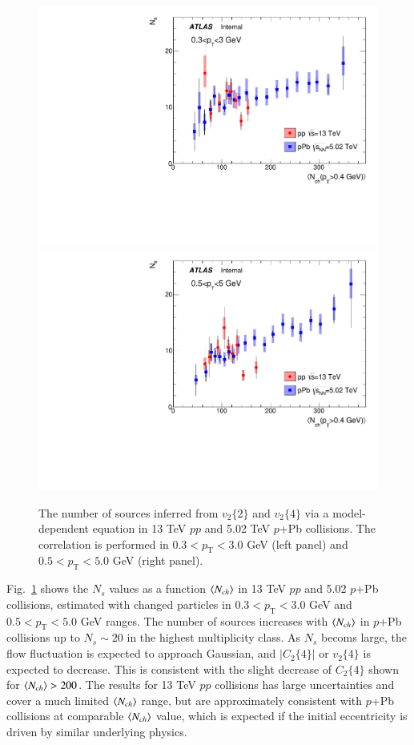 \begin{figure}[H]
\centering
\includegraphics[width=0.45\linewidth]{figs/sec_result/phy_Ns_pt0.pdf}
\includegraphics[width=0.45\linewidth]{figs/sec_result/phy_Ns_pt1.pdf}
\caption{The number of sources inferred from $v_{2}\{2\}$ and $v_{2}\{4\}$ via a model-dependent equation in 13 TeV $pp$ and 5.02 TeV $p$+Pb collisions. The correlation is performed in $0.3<p_{\text{T}}<3.0$ GeV (left panel) and $0.5<p_{\text{T}}<5.0$ GeV (right panel).}
\label{fig:phy_Ns}
\end{figure}
Fig.~\ref{fig:phy_Ns} shows the $N_{s}$ values as a function $\left\langle N_{ch}\right\rangle$ in 13 TeV $pp$ and 5.02 $p$+Pb collisions, estimated with changed particles in $0.3<p_{\text{T}}<3.0$ GeV and $0.5<p_{\text{T}}<5.0$ GeV ranges. The number of sources increases with $\left\langle N_{ch}\right\rangle$ in $p$+Pb collisions up to $N_{s}\sim 20$ in the highest multiplicity class. As $N_{s}$ becoms large, the flow fluctuation is expected to approach Gaussian, and $|C_{2}\{4\}|$ or $v_{2}\{4\}$ is expected to decrease. This is consistent with the slight decrease of $C_{2}\{4\}$ shown for $\left\langle N_{ch}\right\rangle>200$. The results for 13 TeV $pp$ collisions has large uncertainties and cover a much limited $\left\langle N_{ch}\right\rangle$ range, but are approximately consistent with $p$+Pb collisions at comparable $\left\langle N_{ch}\right\rangle$ value, which is expected if the initial eccentricity is driven by similar underlying physics.





